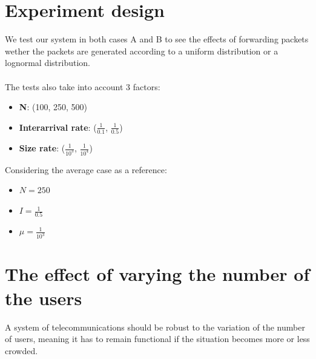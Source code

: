 \documentclass{report}
\begin{document}
\section{Experiment design}
We test our system in both cases A and B to see the effects of forwarding packets wether the packets are generated according to a uniform distribution or a lognormal distribution.\\\\
The tests also take into account 3 factors:
\begin{itemize}
    \item \textbf{N}: (100, 250, 500)
    \item \textbf{Interarrival rate}: ($\frac{1}{0.1}$, $\frac{1}{0.5}$)
    \item \textbf{Size rate}: ($\frac{1}{10^3}$, $\frac{1}{10^4}$)
\end{itemize}

Considering the average case as a reference:
\begin{itemize}
    \item $N=250$
    \item $I=\frac{1}{0.5}$
    \item $\mu=\frac{1}{10^3}$
\end{itemize}

\section{The effect of varying the number of the users}
A system of telecommunications should be robust to the variation of the number of users, meaning it has to remain functional if the situation becomes more or less crowded.
\end{document}
